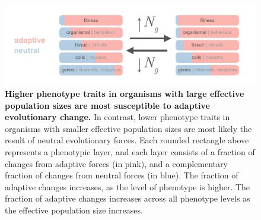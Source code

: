 \documentclass[twocolumn]{article}
\begin{document}
\begin{figure}[htp]
\centering
\includegraphics[width=17 cm]{fig_3.png}
\caption{\textbf{Higher phenotype traits in organisms with large effective population sizes are most susceptible to adaptive evolutionary change.} In contrast, lower phenotype traits in organisms with smaller effective population sizes are most likely the result of neutral evolutionary forces. Each rounded rectangle above represents a phenotypic layer, and each layer consists of a fraction of changes from adaptive forces (in pink), and a complementary fraction of changes from neutral forces (in blue). The fraction of adaptive changes increases, as the level of phenotype is higher. The fraction of adaptive changes increases across all phenotype levels as the effective population size increases.}
\end{figure}
\end{document}

